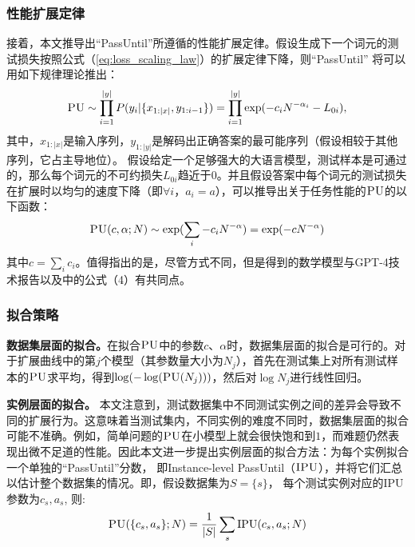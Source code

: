 \subsubsection{性能扩展定律}
接着，本文推导出“PassUntil”所遵循的性能扩展定律。假设生成下一个词元的测试损失按照公式（\ref{eq:loss_scaling_law}）的扩展定律下降，则“PassUntil” 将可以用如下规律理论推出：
\begin{equation}
\label{eq:task_scaling_raw}
    \textsc{PU} \sim \prod_{i=1}^{|y|} P(y_i|\{x_{1:|x|}, y_{1:i - 1}\}) = \prod_{i=1}^{|y|} \exp(-{c_i}{{N}^{-\alpha_i}} - L_{0i}),
\end{equation}
其中，$x_{1:|x|}$是输入序列，$y_{1:|y|}$是解码出正确答案的最可能序列（假设相较于其他序列，它占主导地位）。
假设给定一个足够强大的大语言模型，测试样本是可通过的，那么每个词元的不可约损失$L_{0i}$趋近于$0$。并且假设答案中每个词元的测试损失在扩展时以均匀的速度下降（即$\forall i$，$a_i = a$），可以推导出关于任务性能的$\textsc{PU}$的以下函数：
\begin{equation}
\label{eq:exp_scaling}
    \textsc{PU}(c, \alpha; N) \sim \operatorname{exp}(\sum_i -{c_i}{{N}^{-\alpha}} ) = \operatorname{exp}(-{c}{{N}^{-\alpha}})
\end{equation}
其中$c = \sum_i c_i$。值得指出的是，尽管方式不同，但是得到的数学模型与GPT-4技术报告\citep{openai2023gpt4}以及\citet{schaeffer2023emergent}中的公式（4）有共同点。

\subsubsection{拟合策略}
\textbf{数据集层面的拟合。}在拟合$\textsc{PU}$中的参数$c$、$\alpha$时，数据集层面的拟合是可行的。对于扩展曲线中的第$j$个模型（其参数量大小为$N_j$），首先在测试集上对所有测试样本的$\textsc{PU}$求平均，得到$\operatorname{log}(-\operatorname{log}(\textsc{PU}(N_j)))$，然后对$\operatorname{log}N_j$进行线性回归。

\textbf{实例层面的拟合。}
\label{sec:instance_level_pass}
本文注意到，测试数据集中不同测试实例之间的差异会导致不同的扩展行为。这意味着当测试集内，不同实例的难度不同时，数据集层面的拟合可能不准确。例如，简单问题的$\textsc{PU}$在小模型上就会很快饱和到$1$，而难题仍然表现出微不足道的性能。因此本文进一步提出实例层面的拟合方法：为每个实例拟合一个单独的“PassUntil”分数， 即Instance-level PassUntil（$\textsc{IPU}$），并将它们汇总以估计整个数据集的情况。即，假设数据集为$S = \{s\}$， 每个测试实例对应的IPU参数为$c_s, a_s$, 则:
\begin{equation}
    {\textsc{PU}}(\{c_s, a_s\}; N) = \frac{1}{|S|}\sum_s {\operatorname{IPU}}(c_s, a_s; N)
\end{equation}


